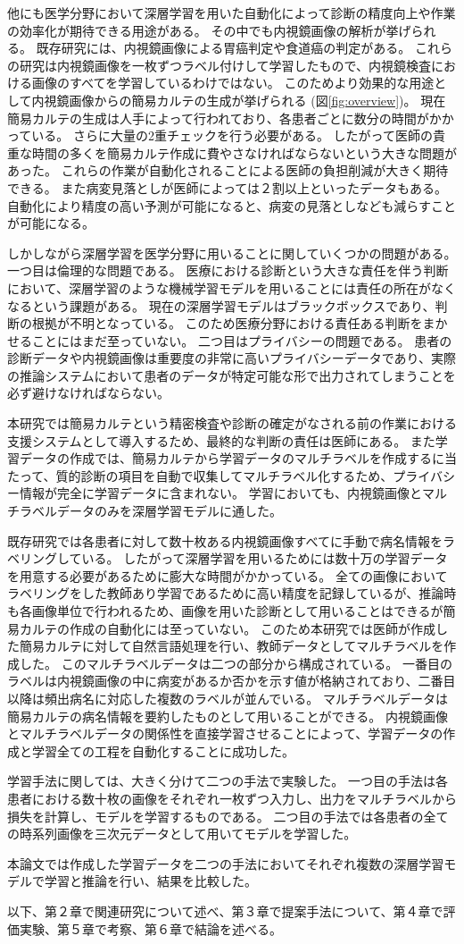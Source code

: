 他にも医学分野において深層学習を用いた自動化によって診断の精度向上や作業の効率化が期待できる用途がある。
その中でも内視鏡画像の解析が挙げられる。
既存研究には、内視鏡画像による胃癌判定\cite{stomach_cancer}や食道癌\cite{esophageal_cancer}の判定がある。
これらの研究は内視鏡画像を一枚ずつラベル付けして学習したもので、内視鏡検査における画像のすべてを学習しているわけではない。
このためより効果的な用途として内視鏡画像からの簡易カルテの生成が挙げられる (図\ref{fig:overview})。
現在簡易カルテの生成は人手によって行われており、各患者ごとに数分の時間がかかっている。
さらに大量の2重チェックを行う必要がある。
したがって医師の貴重な時間の多くを簡易カルテ作成に費やさなければならないという大きな問題があった。
これらの作業が自動化されることによる医師の負担削減が大きく期待できる。
また病変見落としが医師によっては２割以上といったデータ\cite{medical_problem2}もある。
自動化により精度の高い予測が可能になると、病変の見落としなども減らすことが可能になる。

しかしながら深層学習を医学分野に用いることに関していくつかの問題がある。
一つ目は倫理的な問題である。
医療における診断という大きな責任を伴う判断において、深層学習のような機械学習モデルを用いることには責任の所在がなくなるという課題がある。
現在の深層学習モデルはブラックボックスであり、判断の根拠が不明となっている。
このため医療分野における責任ある判断をまかせることにはまだ至っていない。
二つ目はプライバシーの問題である。
患者の診断データや内視鏡画像は重要度の非常に高いプライバシーデータであり、実際の推論システムにおいて患者のデータが特定可能な形で出力されてしまうことを必ず避けなければならない。

本研究では簡易カルテという精密検査や診断の確定がなされる前の作業における支援システムとして導入するため、最終的な判断の責任は医師にある。
また学習データの作成では、簡易カルテから学習データのマルチラベルを作成するに当たって、質的診断の項目を自動で収集してマルチラベル化するため、プライバシー情報が完全に学習データに含まれない。
学習においても、内視鏡画像とマルチラベルデータのみを深層学習モデルに通した。

既存研究では各患者に対して数十枚ある内視鏡画像すべてに手動で病名情報をラベリングしている。
したがって深層学習を用いるためには数十万の学習データを用意する必要があるために膨大な時間がかかっている。
全ての画像においてラベリングをした教師あり学習であるために高い精度を記録しているが、推論時も各画像単位で行われるため、画像を用いた診断として用いることはできるが簡易カルテの作成の自動化には至っていない。
このため本研究では医師が作成した簡易カルテに対して自然言語処理を行い、教師データとしてマルチラベルを作成した。
このマルチラベルデータは二つの部分から構成されている。
一番目のラベルは内視鏡画像の中に病変があるか否かを示す値が格納されており、二番目以降は頻出病名に対応した複数のラベルが並んでいる。
マルチラベルデータは簡易カルテの病名情報を要約したものとして用いることができる。
内視鏡画像とマルチラベルデータの関係性を直接学習させることによって、学習データの作成と学習全ての工程を自動化することに成功した。

学習手法に関しては、大きく分けて二つの手法で実験した。
一つ目の手法は各患者における数十枚の画像をそれぞれ一枚ずつ入力し、出力をマルチラベルから損失を計算し、モデルを学習するものである。
二つ目の手法では各患者の全ての時系列画像を三次元データとして用いてモデルを学習した。

本論文では作成した学習データを二つの手法においてそれぞれ複数の深層学習モデルで学習と推論を行い、結果を比較した。

以下、第２章で関連研究について述べ、第３章で提案手法について、第４章で評価実験、第５章で考察、第６章で結論を述べる。
